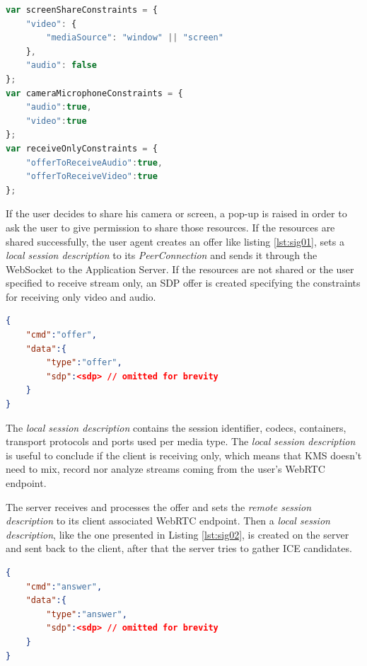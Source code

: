 \begin{minipage}{\linewidth}
\begin{lstlisting}[caption={Media constraints},label={lst:constraints},language=JavaScript]
var screenShareConstraints = {	
	"video": {
		"mediaSource": "window" || "screen"
	}, 
	"audio": false
};
var cameraMicrophoneConstraints = {
	"audio":true, 
	"video":true 
};
var receiveOnlyConstraints = {
	"offerToReceiveAudio":true,
	"offerToReceiveVideo":true
};
\end{lstlisting}
\end{minipage}

If the user decides to share his camera or screen, a pop-up is raised in order to ask the user to give permission to share those resources. If the resources are shared successfully, the user agent creates an offer like listing \ref{lst:sig01}, sets a \emph{local session description} to its \emph{PeerConnection} and sends it through the WebSocket to the Application Server.
If the resources are not shared or the user specified to receive stream only, an \ac{SDP} offer is created specifying the constraints for receiving only video and audio.

\begin{minipage}{\linewidth}
\begin{lstlisting}[caption={Offer created by client},label={lst:sig01},language=json]
{
	"cmd":"offer",
	"data":{
		"type":"offer",
		"sdp":<sdp>	// omitted for brevity
	}
}
\end{lstlisting}
\end{minipage}

The \emph{local session description} contains the session identifier, codecs, containers, transport protocols and ports used per media type. The \emph{local session description} is useful to conclude if the client is receiving only, which means that \ac{KMS} doesn't need to mix, record nor analyze streams coming from the user's \ac{WebRTC} endpoint. 

The server receives and processes the offer and sets the \emph{remote session description} to its client associated \ac{WebRTC} endpoint. Then a \emph{local session description}, like the one presented in Listing \ref{lst:sig02}, is created on the server and sent back to the client, after that the server tries to gather \ac{ICE} candidates.

\begin{minipage}{\linewidth}
\begin{lstlisting}[caption={Answer created by KMS},label={lst:sig02},language=json]
{
	"cmd":"answer",
	"data":{
		"type":"answer",
		"sdp":<sdp>	// omitted for brevity
	}
}
\end{lstlisting}
\end{minipage}

